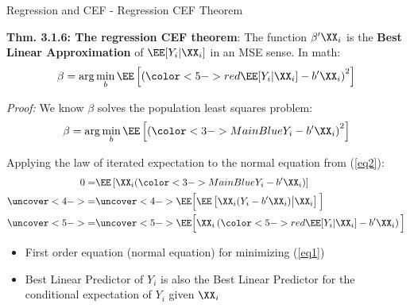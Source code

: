 \documentclass[compress, 8pt]{beamer}
\begin{document}
\begin{frame}{Regression and CEF - Regression CEF Theorem}

\textbf{Thm. 3.1.6: The regression CEF theorem}: The function $\beta^\prime \XX_i$ is the \textbf{Best \alert{Linear} Approximation} of $\EE [Y_i \vert \XX_i]$ in an MSE sense. In math:
\begin{equation}\label{eq1}
    \beta = \arg \min_b \EE \left[ \left({\color<5->{red} \EE[Y_i \vert \XX_i] - b^\prime \XX_i}\right)^2 \right]
\end{equation}

\vspace{1ex}
\emph{Proof: } We know $\beta$ solves the population least squares problem:
\begin{equation}\label{eq2}
    \beta = \arg \min_b \EE \left[ \left({\color<3->{MainBlue} Y_i - b^\prime \XX_i}\right)^2 \right]
\end{equation}

Applying the law of iterated expectation to the normal equation from (\ref{eq2}):
\begin{align*}
    0 =& \EE \left[ \XX_i ({\color<3->{MainBlue} Y_i - b^\prime \XX_i}) \right] \\
    \uncover<4->{=}& \uncover<4->{\EE \Big[ \EE \left[ \XX_i (Y_i - b^\prime \XX_i) \big\vert \XX_i \right] \Big]} \\
    \uncover<5->{=}& \uncover<5->{\EE \Big[ \XX_i \left( {\color<5->{red} \EE[Y_i \vert \XX_i ] - b^\prime \XX_i}  \right) \Big]}
\end{align*}
\begin{itemize}
    \item [$\implies$] First order equation (normal equation) for minimizing (\ref{eq1})
    \item [$\implies$] Best Linear Predictor of $Y_i$ is also the Best Linear Predictor for the conditional expectation of $Y_i$ given $\XX_i$
\end{itemize}



\end{frame}
\end{document}
